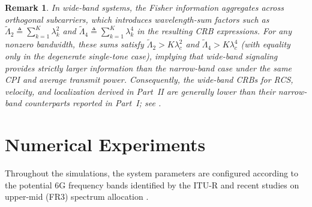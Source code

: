 \documentclass[9pt,final,journal,twocolumn]{IEEEtran}
\newtheorem{remark}{Remark}
\begin{document}

\begin{remark}
In wide-band systems, the Fisher information aggregates across orthogonal subcarriers, which introduces wavelength-sum factors such as
$\widetilde{\Lambda}_2 \triangleq \sum_{k=1}^{K}\lambda_k^{2}$ and
$\widetilde{\Lambda}_4 \triangleq \sum_{k=1}^{K}\lambda_k^{4}$ in the resulting CRB expressions. 
For any nonzero bandwidth, these sums satisfy
$\widetilde{\Lambda}_2 > K\lambda_c^{2}$ and $\widetilde{\Lambda}_4 > K\lambda_c^{4}$ (with equality only in the degenerate single-tone case), implying that wide-band signaling provides strictly larger information than the narrow-band case under the same CPI and average transmit power. 
Consequently, the wide-band CRBs for RCS, velocity, and localization derived in Part~II are generally lower than their narrow-band counterparts reported in Part~I; see \cite{wei2025PartI}.
\end{remark}



\section{Numerical Experiments}
 
Throughout the simulations, the system parameters are configured according to the potential 6G frequency bands identified by the ITU-R and recent studies on upper-mid (FR3) spectrum allocation \cite{testolina2024sharing,emil2025enabling}.
\end{document}
